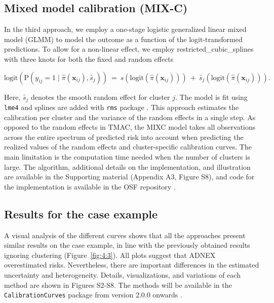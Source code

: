 \subsection{Mixed model calibration (MIX-C)}
In the third approach, we employ a one-stage logistic generalized linear mixed model (\gls{GLMM}) to model the outcome as a function of the logit-transformed predictions. To allow for a non-linear effect, we employ \gls{restricted_cubic_splines} with three knots for both the fixed and random effects

\[\text{logit}\left( \text{P}\left( y_{ij} = 1\mid\widehat{\pi}\left( \mathbf{x}_{ij} \right),\widetilde{s_{j}} \right) \right)\  = \ s\left( \text{logit}\left( \widehat{\pi}\left( \mathbf{x}_{ij} \right) \right) \right)\  + \ \widetilde{s_{j}}\left( \text{logit}\left( \widehat{\pi}\left( \mathbf{x}_{ij} \right) \right) \right).\]

Here, \(\widetilde{s_{j}}\) denotes the smooth random effect for cluster \(j\). The model is fit using \texttt{lme4} \cite{batesFittingLinearMixedEffects2015} and splines are added with \texttt{rms} package \cite{harrelljrRmsRegressionModeling2009}. This approach estimates the calibration per cluster and the variance of the random effects in a single step. As opposed to the random effects in \gls{TMAC}, the \gls{MIXC} model takes all observations across the entire spectrum of predicted risk into account when predicting the realized values of the random effects and cluster-specific calibration curves. The main limitation is the computation time needed when the number of clusters is large. The algorithm, additional details on the implementation, and illustration are available in the Supporting material (Appendix A3, Figure S8), and code for the implementation is available in the \gls{OSF} repository \cite{barrenadaOSFClusteredFlexible2024}.

\subsection{Results for the case example}
A visual analysis of the different curves shows that all the approaches present similar results on the case example, in line with the previously obtained results ignoring clustering (Figure~\ref{fig:4:3}). All plots suggest that \gls{ADNEX} overestimated risks. Nevertheless, there are important differences in the estimated uncertainty and heterogeneity. Details, visualizations, and variations of each method are shown in Figures S2-S8. The methods will be available in the \texttt{CalibrationCurves} package from version 2.0.0 onwards \cite{decockCalibrationCurvesPackageAssessing2023}.

